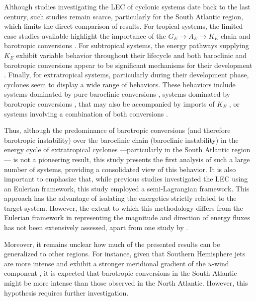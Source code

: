 \documentclass[pdflatex,sn-chicago]{sn-jnl}%
\theoremstyle{plain}
\theoremstyle{definition}
\theoremstyle{remark}
\theoremstyle{definition}
\begin{document}
Although studies investigating the LEC of cyclonic systems date back to the last century, such studies remain scarce, particularly for the South Atlantic region, which limits the direct comparison of results. For tropical systems, the limited case studies available highlight the importance of the \( G_E \rightarrow A_E \rightarrow K_E \) chain and barotropic conversions \citep{brennan1980zonal,veiga2008analysis}. For subtropical systems, the energy pathways supplying \( K_E \) exhibit variable behavior throughout their lifecycle and both baroclinic and barotropic conversions appear to be significant mechanisms for their development \citep{michaelides1987limited,dias2013synoptic,pezza2014large,cavicchia2018energetics}. Finally, for extratropical systems, particularly during their development phase, cyclones seem to display a wide range of behaviors. These behaviors include systems dominated by pure baroclinic conversions \citep{dias2011energy,black2013universal}, systems dominated by barotropic conversions \citep{michaelides1992spatial,dias2011energy}, that may also be accompanied by imports of \( K_E \) \citep{wahab2002mechanism}, or systems involving a combination of both conversions \citep{bulic2006limited,pezza2010environmental}.

Thus, although the predominance of barotropic conversions (and therefore barotropic instability) over the baroclinic chain (baroclinic instability) in the energy cycle of extratropical cyclones —particularly in the South Atlantic region — is not a pioneering result, this study presents the first analysis of such a large number of systems, providing a consolidated view of this behavior. It is also important to emphasize that, while previous studies investigated the LEC using an Eulerian framework, this study employed a semi-Lagrangian framework. This approach has the advantage of isolating the energetics strictly related to the target system. However, the extent to which this methodology differs from the Eulerian framework in representing the magnitude and direction of energy fluxes has not been extensively assessed, apart from one study by \citet{michaelides1999quasi}.

Moreover, it remains unclear how much of the presented results can be generalized to other regions. For instance, given that Southern Hemisphere jets are more intense and exhibit a stronger meridional gradient of the \( u \)-wind component \citep[e.g.,][]{swart2019canadian,jain2023monsoon,savita2023assessment}, it is expected that barotropic conversions in the South Atlantic might be more intense than those observed in the North Atlantic. However, this hypothesis requires further investigation.
\end{document}
